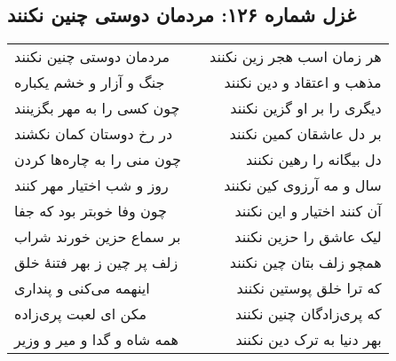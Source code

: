 \begin{center}
\section*{غزل شماره ۱۲۶: مردمان دوستی چنین نکنند}
\label{sec:126}
\begin{longtable}{l p{0.5cm} r}
مردمان دوستی چنین نکنند
&&
هر زمان اسب هجر زین نکنند
\\
جنگ و آزار و خشم یکباره
&&
مذهب و اعتقاد و دین نکنند
\\
چون کسی را به مهر بگزینند
&&
دیگری را بر او گزین نکنند
\\
در رخ دوستان کمان نکشند
&&
بر دل عاشقان کمین نکنند
\\
چون منی را به چاره‌ها کردن
&&
دل بیگانه را رهین نکنند
\\
روز و شب اختیار مهر کنند
&&
سال و مه آرزوی کین نکنند
\\
چون وفا خوبتر بود که جفا
&&
آن کنند اختیار و این نکنند
\\
بر سماع حزین خورند شراب
&&
لیک عاشق را حزین نکنند
\\
زلف پر چین ز بهر فتنهٔ خلق
&&
همچو زلف بتان چین نکنند
\\
اینهمه می‌کنی و پنداری
&&
که ترا خلق پوستین نکنند
\\
مکن ای لعبت پری‌زاده
&&
که پری‌زادگان چنین نکنند
\\
همه شاه و گدا و میر و وزیر
&&
بهر دنیا به ترک دین نکنند
\\
\end{longtable}
\end{center}

